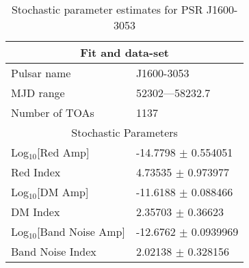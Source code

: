 \documentclass{article}
\begin{document}
\begin{table*}
\caption{Stochastic parameter estimates for PSR J1600-3053}
\begin{tabular}{ll}
\hline\hline
\multicolumn{2}{c}{Fit and data-set} \\ 
\hline
Pulsar name\dotfill & J1600-3053 \\ 
MJD range\dotfill & 52302---58232.7 \\ 
Number of TOAs\dotfill & 1137 \\
\hline
\multicolumn{2}{c}{Stochastic Parameters} \\ 
\hline
Log$_{10}$[Red Amp] \dotfill & -14.7798 $\pm$ 0.554051  \\ 
Red Index \dotfill & 4.73535 $\pm$ 0.973977  \\ 
Log$_{10}$[DM Amp] \dotfill & -11.6188 $\pm$ 0.088466  \\ 
DM Index \dotfill & 2.35703 $\pm$ 0.36623  \\ 
Log$_{10}$[Band Noise Amp] \dotfill & -12.6762 $\pm$ 0.0939969  \\ 
Band Noise Index \dotfill & 2.02138 $\pm$ 0.328156  \\ 
\hline
\end{tabular}
\label{Table:J1600-3053}
\end{table*} 
\end{document}
